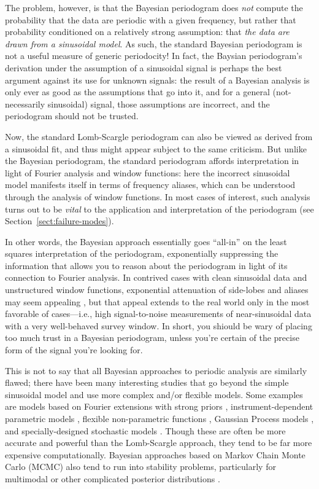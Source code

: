 \documentclass[preprint]{aastex}
\newcommand{\Sect}[1]{Section~\ref{sect:#1}}
\newcommand{\sect}[1]{\Sect{#1}}
\begin{document}
The problem, however, is that the Bayesian periodogram does {\it not} compute
the probability that the data are periodic with a given frequency, but rather
that probability conditioned on a relatively strong assumption:
that {\it the data are drawn from a sinusoidal model}.
As such, the standard Bayesian periodogram is not a useful measure of
generic periodocity!
In fact, the Baysian periodogram's derivation under the
assumption of a sinusoidal signal is perhaps the
best argument against its use for unknown signals:
the result of a Bayesian analysis is only ever as good as the assumptions that
go into it, and for a general (not-necessarily sinusoidal) signal, those
assumptions are incorrect, and the periodogram should not be trusted.

Now, the standard Lomb-Scargle periodogram can also be viewed as derived
from a sinusoidal fit, and thus might appear subject to the same criticism.
But unlike the Bayesian periodogram, the standard periodogram affords
interpretation in light of Fourier analysis and window functions: here
the incorrect sinusoidal model manifests itself in terms of frequency
aliases, which can be understood through the analysis of window functions.
In most cases of interest, such analysis turns out to be {\it vital} to the
application and interpretation of the periodogram (see \sect{failure-modes}).

In other words, the Bayesian approach essentially
goes ``all-in'' on the least squares
interpretation of the periodogram, exponentially suppressing the information
that allows you to reason about the periodogram in light of its connection
to Fourier analysis.
In contrived cases with clean sinusoidal data and unstructured window
functions, exponential attenuation
of side-lobes and aliases may seem appealing \citep[see, e.g.][]{Mortier15},
but that appeal extends to the real world only in the most favorable of
cases---i.e., high signal-to-noise measurements of near-sinusoidal data with
a very well-behaved survey window.
In short, you shiould be wary of placing too much trust in a Bayesian
periodogram, unless you're certain of the precise form of the signal
you're looking for.

This is not to say that all Bayesian approaches to periodic analysis are
similarly flawed; there have been many interesting studies that go beyond
the simple sinusoidal model and use more complex and/or flexible models.
Some examples are models based on Fourier
extensions with strong priors \citep[e.g.][]{Bretthorst88},
instrument-dependent parametric models \citep[e.g.][]{Angus16},
flexible non-parametric functions \citep[e.g.][]{Gregory92},
Gaussian Process models \citep[e.g.][]{Wang2012}, and
specially-designed stochastic models \citep[e.g.][]{Kelly14}.
Though these are often be more accurate and powerful than the Lomb-Scargle
approach, they tend to be far more expensive computationally.
Bayesian approaches based on Markov Chain Monte Carlo (MCMC) also tend to
run into stability problems,
particularly for multimodal or other complicated posterior distributions
\citep[See, for example, the RR Lyrae discussion in][]{Kelly14}.
\end{document}
